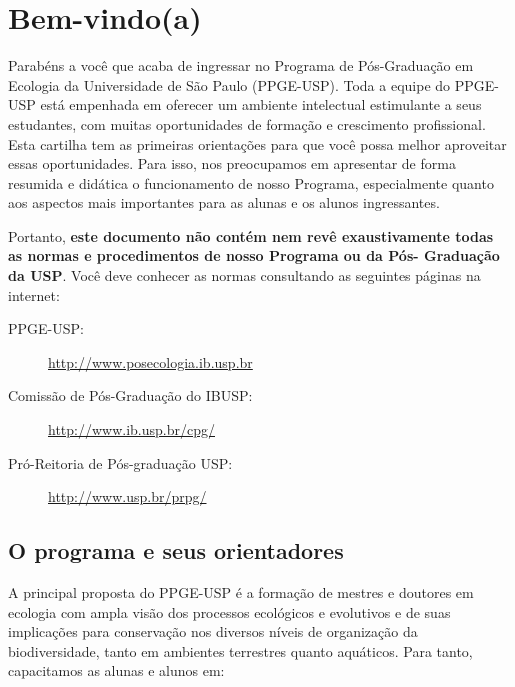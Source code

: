\documentclass[twoside a4paper 12pt]{report}
\begin{document}
\Large




\pagestyle{fancy}


\chapter{Bem-vindo(a)}
\label{chap:aprest}

Parabéns a você que acaba de ingressar no Programa de Pós-Graduação em
Ecologia da Universidade de São Paulo (PPGE-USP). Toda a equipe do
PPGE-USP está empenhada em oferecer um ambiente intelectual
estimulante a seus estudantes, com muitas oportunidades de formação e
crescimento profissional. Esta cartilha tem as primeiras orientações
para que você possa melhor aproveitar essas oportunidades. Para isso,
nos preocupamos em apresentar de forma resumida e didática o
funcionamento de nosso Programa, especialmente quanto aos aspectos
mais importantes para as alunas e os alunos ingressantes.

Portanto, \textbf{este documento não contém nem revê exaustivamente
todas as normas e procedimentos de nosso Programa ou da Pós- Graduação
da USP}. Você deve conhecer as normas consultando as seguintes páginas
na internet:

\begin{description}
\item[PPGE-USP:] \url{http://www.posecologia.ib.usp.br}
\item[Comissão de Pós-Graduação do IBUSP:] \url{http://www.ib.usp.br/cpg/}
\item[Pró-Reitoria de Pós-graduação USP:] \url{http://www.usp.br/prpg/}
\end{description}


\section{O programa e seus orientadores}

A principal proposta do PPGE-USP é a formação de mestres e doutores em ecologia com ampla
visão dos processos ecológicos e evolutivos e de suas implicações para
conservação nos diversos níveis de organização da biodiversidade, tanto
em ambientes terrestres quanto aquáticos. Para tanto, capacitamos as
alunas e alunos em:
\end{document}
